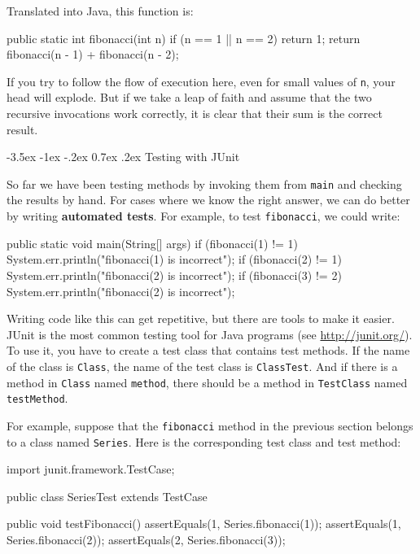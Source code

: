 \documentclass[12pt]{book}
\makeatletter
\theoremstyle{exercise}
\newcommand{\java}[1]{\verb"#1"}
\renewcommand{\section}{\@startsection{section}{1}{\z@}%
    {-3.5ex \@plus -1ex \@minus -.2ex}%
    {0.7ex \@plus.2ex}%
    {\normalfont\Large\bfseries}}
\newcommand{\java}[1]{\lstinline{#1}} %
\makeatother
\begin{document}
Translated into Java, this function is:

\begin{code}
    public static int fibonacci(int n) {
        if (n == 1 || n == 2) {
            return 1;
        }
        return fibonacci(n - 1) + fibonacci(n - 2);
    }
\end{code}

If you try to follow the flow of execution here, even for small values of \java{n}, your head will explode.
But if we take a leap of faith and assume that the two recursive invocations work correctly, it is clear that their sum is the correct result.


\section{Testing with JUnit}
\label{JUnit}

So far we have been testing methods by invoking them from \java{main} and checking the results by hand.
For cases where we know the right answer, we can do better by writing {\bf automated tests}.
For example, to test \java{fibonacci}, we could write:

\begin{code}
    public static void main(String[] args) {
        if (fibonacci(1) != 1) {
            System.err.println("fibonacci(1) is incorrect");
        }
        if (fibonacci(2) != 1) {
            System.err.println("fibonacci(2) is incorrect");
        }
        if (fibonacci(3) != 2) {
            System.err.println("fibonacci(2) is incorrect");
        }
    }
\end{code}

Writing code like this can get repetitive, but there are tools to make it easier.
JUnit is the most common testing tool for Java programs (see \url{http://junit.org/}).
To use it, you have to create a test class that contains test methods.
If the name of the class is \java{Class}, the name of the test class is \java{ClassTest}.
And if there is a method in \java{Class} named \java{method}, there should be a method in \java{TestClass} named \java{testMethod}.

For example, suppose that the \java{fibonacci} method in the previous section belongs to a class named \java{Series}.
Here is the corresponding test class and test method:

\begin{code}
import junit.framework.TestCase;

public class SeriesTest extends TestCase {

    public void testFibonacci() {
        assertEquals(1, Series.fibonacci(1));
        assertEquals(1, Series.fibonacci(2));
        assertEquals(2, Series.fibonacci(3));
    }
}
\end{code}
\end{document}
